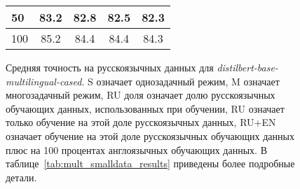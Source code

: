 \begin{figure}[!htbp]
\begin{minipage}{0.45\textwidth}
\begin{tabular}[baseline={(0,2.1)}]{|l||c|c|c|c|}
50 & 83.2 & 82.8 & 82.5 & 82.3 \\ \hline
100 & 85.2 & 84.4 & 84.4 & 84.3 \\ \hline
\end{tabular}
\end{minipage}
\caption{Средняя точность на русскоязычных данных для \textit{distilbert-base-multilingual-cased}. S означает однозадачный режим, M означает многозадачный режим, RU доля означает долю русскоязычных обучающих данных, использованных при обучении, RU означает только обучение на этой доле русскоязычных данных, RU+EN означает обучение на этой доле русскоязычных обучающих данных плюс на 100 процентах англоязычных обучающих данных. В таблице~\ref{tab:mult_smalldata_results} приведены более подробные детали.}
\end{figure}



